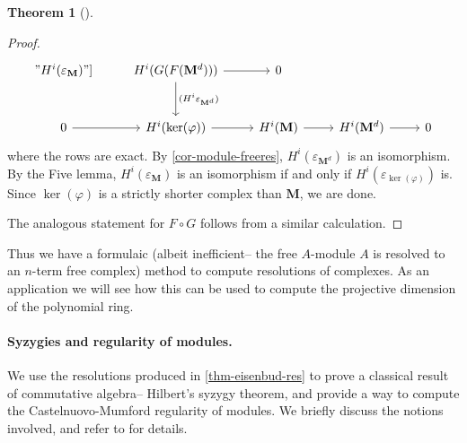 \documentclass[a4paper]{article}
\theoremstyle{definition}
\newtheorem{theorem}[defn]{Theorem}
\theoremstyle{remark}
\begin{document}
\begin{theorem}[]
\begin{proof}
\[\begin{tikzcd}[row sep=large]
            "H^i(\varepsilon_\mathbf{M})"]
            & H^i(G(F(\mathbf{M}^d))) \arrow[r] \arrow[d, "(H^i
            \varepsilon_{\mathbf{M}^d})"]
            & 0 \\ 
            0 \arrow[r]
            & H^i(\ker(\varphi)) \arrow[r]
            & H^i(\mathbf{M}) \arrow[r]
            & H^i(\mathbf{M}^d) \arrow[r]
            & 0
        \end{tikzcd}\]
        where the rows are exact. By \cref{cor-module-freeres},
        \(H^i(\varepsilon_{\mathbf{M}^d})\) is an isomorphism. By the Five
        lemma, \(H^i(\varepsilon_\mathbf{M})\) is an isomorphism if and only if
        \(H^i(\varepsilon_{\ker(\varphi)})\) is. Since \(\ker(\varphi)\) is a
        strictly shorter complex than \(\mathbf{M}\), we are done.

        The analogous statement for \(F\circ G\) follows from a similar
        calculation.
    \end{proof}
\end{theorem}

Thus we have a formulaic (albeit inefficient-- the free \(A\)-module \(A\) is
resolved to an \(n\)-term free complex) method to compute resolutions of
complexes. As an application we will see how this can be used to compute the
projective dimension of the polynomial ring.

\paragraph{Syzygies and regularity of modules.} We use the resolutions produced
in \cref{thm-eisenbud-res} to prove a classical result of commutative algebra--
Hilbert's syzygy theorem, and provide a way to compute the Castelnuovo-Mumford
regularity of modules. We briefly discuss the notions involved, and refer to
 for details.
\end{document}
